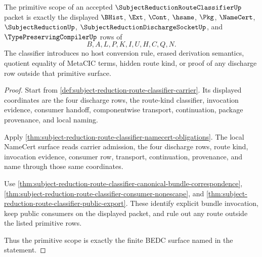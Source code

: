 \begin{theorem}
\label{thm:subject-reduction-route-classifier-primitive-scope}
The primitive scope of an accepted $\SubjectReductionRouteClassifierUp$ packet is exactly the displayed $\BHist$, $\Ext$, $\Cont$, $\hsame$, $\Pkg$, $\NameCert$, $\SubjectReductionUp$, $\SubjectReductionDischargeSocketUp$, and $\TypePreservingCompilerUp$ rows of
$$
B,A,L,P,K,I,U,H,C,Q,N .
$$
The classifier introduces no host conversion rule, erased derivation semantics, quotient equality of MetaCIC terms, hidden route kind, or proof of any discharge row outside that primitive surface.
\end{theorem}
\begin{proof}
Start from \autoref{def:subject-reduction-route-classifier-carrier}. Its displayed coordinates are the four discharge rows, the route-kind classifier, invocation evidence, consumer handoff, componentwise transport, continuation, package provenance, and local naming.

Apply \autoref{thm:subject-reduction-route-classifier-namecert-obligations}. The local NameCert surface reads carrier admission, the four discharge rows, route kind, invocation evidence, consumer row, transport, continuation, provenance, and name through those same coordinates.

Use \autoref{thm:subject-reduction-route-classifier-canonical-bundle-correspondence}, \autoref{thm:subject-reduction-route-classifier-consumer-nonescape}, and \autoref{thm:subject-reduction-route-classifier-public-export}. These identify explicit bundle invocation, keep public consumers on the displayed packet, and rule out any route outside the listed primitive rows.

Thus the primitive scope is exactly the finite BEDC surface named in the statement.
\end{proof}

